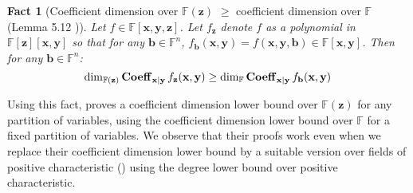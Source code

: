 \documentclass[11pt]{article}
\newtheorem{fact}[theorem]{Fact}
\newcommand{\F}{\mathbb{F}}
\begin{document}
\begin{fact}[Coefficient dimension over $\F(\mathbf{z})$ $\geq$ coefficient dimension over $\F$ (Lemma 5.12 \cite{FSTW21})]\label{fact: coeff dim F(z) vs F}
    Let $f\in \F[\mathbf{x},\mathbf{y},\mathbf{z}]$. Let $f_\mathbf{z}$ denote $f$ as a polynomial in $\F[\mathbf{z}][\mathbf{x},\mathbf{y}]$ so that for any $\mathbf{b} \in \F^n$, $f_\mathbf{b}(\mathbf{x},\mathbf{y}) = f(\mathbf{x},\mathbf{y},\mathbf{b}) \in \F[\mathbf{x},\mathbf{y}]$. Then for any $\mathbf{b} \in \F^n$: $$\dim_{\F(\mathbf{z})}\bfCoeff_{\mathbf{x}|\mathbf{y}}f_\mathbf{z}(\mathbf{x},\mathbf{y}) \geq \dim_{\F}\bfCoeff_{\mathbf{x}|\mathbf{y}}f_{\mathbf{\mathbf{b}}}(\mathbf{x},\mathbf{y})$$
\end{fact}
Using this fact, \cite{FSTW21} proves a coefficient dimension lower bound over $\F(\mathbf{z})$ for any partition of variables, using the coefficient dimension lower bound over $\F$ for a fixed partition of variables. We observe that their proofs work even when we replace their coefficient dimension lower bound by a suitable version over fields of positive characteristic () using the degree lower bound over positive characteristic.
\end{document}

